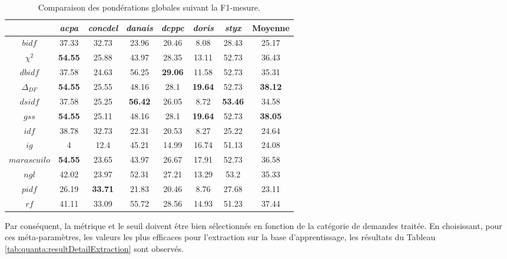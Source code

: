 \begin{table}[!htb]
	\centering \scriptsize
	\begin{tabular}{|c|c|c|c|c|c|c|c|}
		\hline
		& \textit{acpa} & \textit{concdel} & \textit{danais} & \textit{dcppc} & \textit{doris} & \textit{styx} & \textbf{Moyenne} \\ \hline
		$bidf$ & 37.33 & 32.73 & 23.96 & 20.46 & 8.08 & 28.43 & 25.17 \\ \hline
		$\chi^2$ & \textbf{54.55} & 25.88 & 43.97 & 28.35 & 13.11 & 52.73 & 36.43 \\ \hline
		$dbidf$ & 37.58 & 24.63 & 56.25 & \textbf{29.06} & 11.58 & 52.73 & 35.31 \\ \hline
		$\Delta_{DF}$ & \textbf{54.55} & 25.55 & 48.16 & 28.1 & \textbf{19.64} & 52.73 & \textbf{38.12} \\ \hline
		$dsidf$ & 37.58 & 25.25 & \textbf{56.42} & 26.05 & 8.72 & \textbf{53.46} & 34.58 \\ \hline
		$gss$ & \textbf{54.55} & 25.11 & 48.16 & 28.1 & \textbf{19.64} & 52.73 & \textbf{38.05} \\ \hline
		$idf$ & 38.78 & 32.73 & 22.31 & 20.53 & 8.27 & 25.22 & 24.64 \\ \hline
		$ig$ & 4 & 12.4 & 45.21 & 14.99 & 16.74 & 51.13 & 24.08 \\ \hline
		$marascuilo$ & \textbf{54.55} & 23.65 & 43.97 & 26.67 & 17.91 & 52.73 & 36.58 \\ \hline
		$ngl$ & 42.02 & 23.97 & 52.31 & 27.21 & 13.29 & 53.2 & 35.33 \\ \hline
		$pidf$ & 26.19 & \textbf{33.71} & 21.83 & 20.46 & 8.76 & 27.68 & 23.11 \\ \hline
		$rf$ & 41.11 & 33.09 & 55.72 & 28.56 & 14.93 & 51.23 & 37.44 \\ \hline
	\end{tabular}
\caption{Comparaison des pondérations globales suivant la F1-mesure.} \label{tab:quanta:compareGW}
\end{table}

Par conséquent, la métrique et le seuil doivent être bien sélectionnés en fonction de la catégorie de demandes traitée. En choisissant, pour ces méta-paramètres, les valeurs les plus efficaces pour l'extraction sur la base d'apprentissage, les résultats du Tableau \ref{tab:quanta:resultDetailExtraction} sont observés.
 

